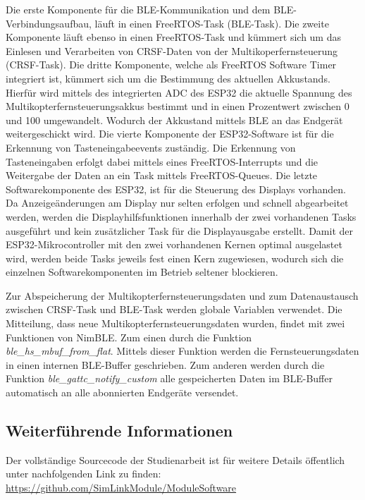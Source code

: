 Die erste Komponente für die \ac{BLE}-Kommunikation und dem \ac{BLE}-Verbindungsaufbau, läuft in einen FreeRTOS-Task (\ac{BLE}-Task). Die zweite Komponente läuft ebenso in einen FreeRTOS-Task und kümmert sich um das Einlesen und Verarbeiten von CRSF-Daten von der Multikoperfernsteuerung (CRSF-Task). Die dritte Komponente, welche als FreeRTOS Software Timer integriert ist, kümmert sich um die Bestimmung des aktuellen Akkustands. Hierfür wird mittels des integrierten \ac{ADC} des ESP32 die aktuelle Spannung des Multikopterfernsteuerungsakkus bestimmt und in einen Prozentwert zwischen 0 und 100 umgewandelt. Wodurch der Akkustand mittels \ac{BLE} an das Endgerät weitergeschickt wird. Die vierte Komponente der ESP32-Software ist für die Erkennung von Tasteneingabeevents zuständig. Die Erkennung von Tasteneingaben erfolgt dabei mittels eines FreeRTOS-Interrupts und die Weitergabe der Daten an ein Task mittels FreeRTOS-Queues. Die letzte Softwarekomponente des ESP32, ist für die Steuerung des Displays vorhanden. Da Anzeigeänderungen am Display nur selten erfolgen und schnell abgearbeitet werden, werden die Displayhilfsfunktionen innerhalb der zwei vorhandenen Tasks ausgeführt und kein zusätzlicher Task für die Displayausgabe erstellt. Damit der ESP32-Mikrocontroller mit den zwei vorhandenen Kernen optimal ausgelastet wird, werden beide Tasks jeweils fest einen Kern zugewiesen, wodurch sich die einzelnen Softwarekomponenten im Betrieb seltener blockieren.

Zur Abspeicherung der Multikopterfernsteuerungsdaten und zum Datenaustausch zwischen CRSF-Task und \ac{BLE}-Task werden globale Variablen verwendet. Die Mitteilung, dass neue Multikopterfernsteuerungsdaten wurden, findet mit zwei Funktionen von NimBLE. Zum einen durch die Funktion  \textit{ble\_hs\_mbuf\_from\_flat}. Mittels dieser Funktion werden die Fernsteuerungsdaten in einen internen \ac{BLE}-Buffer geschrieben. Zum anderen werden durch die Funktion \textit{ble\_gattc\_notify\_custom} alle gespeicherten Daten im \ac{BLE}-Buffer automatisch an alle abonnierten Endgeräte versendet.

\subsection{Weiterführende Informationen}
Der vollständige Sourcecode der Studienarbeit ist für weitere Details öffentlich unter nachfolgenden Link zu finden: \url{https://github.com/SimLinkModule/ModuleSoftware}

